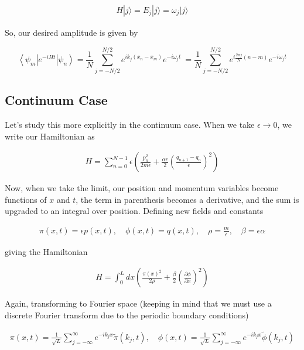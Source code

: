 \documentclass[pre,floatfix,onecolumn]{revtex4-2}
\begin{document}
\begin{align}
H|j\rangle = E_{j}|j\rangle = \omega_{j}|j\rangle
\end{align}

So, our desired amplitude is given by

\begin{widetext}
\begin{equation}
\boxed{\left\langle\psi_{m}\left|e^{-i H t}\right| \psi_{n}\right\rangle = \frac{1}{N} \sum_{j=-N / 2}^{N / 2} e^{i k_{j}\left(x_{n}-x_{m}\right)} e^{-i \omega_{j} t} \
= \frac{1}{N} \sum_{j=-N / 2}^{N / 2} e^{i \frac{2 \pi j}{N}(n-m)} e^{-i \omega_{j} t}}
\end{equation}
\end{widetext}

\subsection{Continuum Case}

Let's study this more explicitly in the continuum case. When we take $\epsilon \rightarrow 0$, we write our Hamiltonian as

\begin{align}
H = \sum_{n=0}^{N-1} \epsilon\left(\frac{p_{n}^{2}}{2 m \epsilon}+\frac{\alpha \epsilon}{2}\left(\frac{q_{n+1}-q_{n}}{\epsilon}\right)^{2}\right)
\end{align}

Now, when we take the limit, our position and momentum variables become functions of $x$ and $t$, the term in parenthesis becomes a derivative, and the sum is upgraded to an integral over position. Defining new fields and constants

\begin{align}
\pi(x, t) = \epsilon p(x, t), \quad \phi(x, t) = q(x, t), \quad \rho = \frac{m}{\epsilon}, \quad \beta = \epsilon \alpha
\end{align}

giving the Hamiltonian

\begin{align}
H = \int_{0}^{L} d x\left(\frac{\pi(x)^{2}}{2 \rho}+\frac{\beta}{2}\left(\frac{\partial \phi}{\partial x}\right)^{2}\right)
\end{align}

Again, transforming to Fourier space (keeping in mind that we must use a discrete Fourier transform due to the periodic boundary conditions)

\begin{align}
\pi(x, t) = \frac{1}{\sqrt{L}} \sum_{j=-\infty}^{\infty} e^{-i k_{j} x} \tilde{\pi}\left(k_{j}, t\right), \quad
\phi(x, t) = \frac{1}{\sqrt{L}} \sum_{j=-\infty}^{\infty} e^{-i k_{j} x} \tilde{\phi}\left(k_{j}, t\right)
\end{align}
\end{document}
